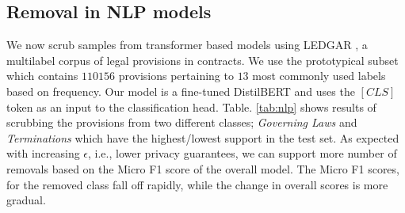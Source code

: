 \subsection{Removal in NLP models}
We now scrub samples from transformer based models using  LEDGAR \cite{tuggener2020ledgar}, a multilabel corpus of legal provisions in contracts. We use the prototypical subset which contains $110156$ provisions pertaining to $13$ most commonly used labels based on frequency. Our model is a fine-tuned DistilBERT \cite{sanh2019distilbert} and uses the $[CLS]$ token as an input to the classification head. 
Table. \ref{tab:nlp} shows results of scrubbing the provisions from two different classes; \textit{Governing Laws} and \textit{Terminations} which have the highest/lowest support in the test set. As expected with increasing $\epsilon$, i.e., lower privacy guarantees, we can support more number of removals based on the Micro F1 score of the overall model. 
The Micro F1 scores, for the removed class fall off rapidly, while the change in overall scores is more gradual. 



